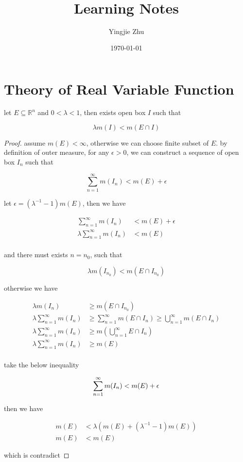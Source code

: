 \documentclass[11pt,a4paper]{article}
\title{Learning Notes}
\author{Yingjie Zhu}
\date{\today}
\begin{document}
\maketitle

\section{Theory of Real Variable Function}

\begin{exercise}
    let $E \subseteq \mathbb{R}^n$ and $0 < \lambda < 1$, then exists open box $I$ such that

    \[
        \lambda m(I) < m(E \cap I)
    \]
\end{exercise}

\begin{proof}
    assume $m(E) < \infty$, otherwise we can choose finite subset of $E$. by definition of outer measure, 
    for any $\epsilon > 0$, we can construct a sequence of open box $I_n$ such that

    \[
        \sum_{n=1}^{\infty}m(I_n) < m(E) + \epsilon
    \]

    let $\epsilon = (\lambda^{-1} - 1)m(E)$, then we have

    \begin{align*}
        \sum_{n=1}^{\infty}m(I_n) &< m(E) + \epsilon \\
        \lambda \sum_{n=1}^{\infty}m(I_n) &< m(E)  \\
    \end{align*}

    and there must exists $n = n_0$, such that

    \[
        \lambda m(I_{n_0}) < m(E \cap I_{n_0})
    \]

    otherwise we have

    \begin{align*}
        \lambda m(I_{n}) &\ge m(E \cap I_{n_0}) \\
        \lambda \sum_{n=1}^{\infty}m(I_{n}) &\ge \sum_{n=1}^{\infty} m(E \cap I_{n}) \ge \bigcup_{n=1}^{\infty}m(E \cap I_n)\\
        \lambda \sum_{n=1}^{\infty}m(I_{n}) &\ge m(\bigcup_{n=1}^{\infty}E \cap I_n)\\
        \lambda \sum_{n=1}^{\infty}m(I_{n}) &\ge m(E)\\
    \end{align*}

    take the below inequality

    \[
        \sum_{n=1}^{\infty}m(I_n) < m(E) + \epsilon \\
    \]
    
    then we have

    \begin{align*}
        m(E) &< \lambda(m(E) + (\lambda ^{-1} -1)m(E)) \\
        m(E) &< m(E)
    \end{align*}

    which is contradict
\end{proof}
\end{document}
